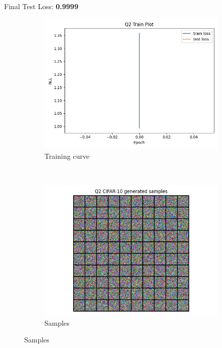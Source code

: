 \documentclass{article}
\begin{document}
\newpage
{} \\

    
Final Test Loss: \textbf{0.9999} \\
\begin{figure}[H]
    \centering
    \begin{subfigure}{0.7\textwidth}
        \centering
        \includegraphics[width=\textwidth]{figures/q2_train_plot.png}
        \caption{Training curve}
    \end{subfigure}
    \\
    \begin{subfigure}{0.7\textwidth}
        \centering
        \includegraphics[width=\textwidth]{figures/q2_samples.png}
        \caption{Samples}
    \end{subfigure}
    
\end{figure}
\end{document}
